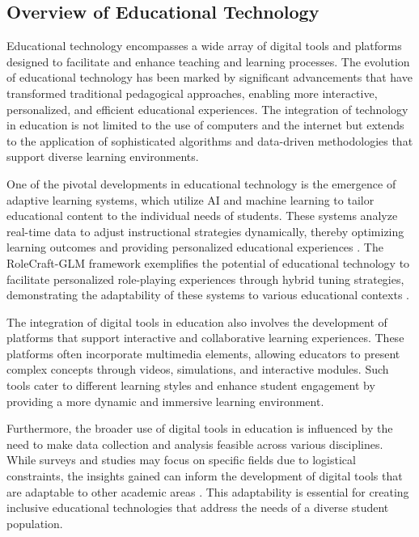 \subsection{Overview of Educational Technology} \label{subsec:Overview of Educational Technology}

Educational technology encompasses a wide array of digital tools and platforms designed to facilitate and enhance teaching and learning processes. The evolution of educational technology has been marked by significant advancements that have transformed traditional pedagogical approaches, enabling more interactive, personalized, and efficient educational experiences. The integration of technology in education is not limited to the use of computers and the internet but extends to the application of sophisticated algorithms and data-driven methodologies that support diverse learning environments.

One of the pivotal developments in educational technology is the emergence of adaptive learning systems, which utilize AI and machine learning to tailor educational content to the individual needs of students. These systems analyze real-time data to adjust instructional strategies dynamically, thereby optimizing learning outcomes and providing personalized educational experiences \cite{meek2015structureparameterlearningcausal}. The RoleCraft-GLM framework exemplifies the potential of educational technology to facilitate personalized role-playing experiences through hybrid tuning strategies, demonstrating the adaptability of these systems to various educational contexts \cite{tao2024rolecraftglmadvancingpersonalizedroleplaying}.

The integration of digital tools in education also involves the development of platforms that support interactive and collaborative learning experiences. These platforms often incorporate multimedia elements, allowing educators to present complex concepts through videos, simulations, and interactive modules. Such tools cater to different learning styles and enhance student engagement by providing a more dynamic and immersive learning environment.

Furthermore, the broader use of digital tools in education is influenced by the need to make data collection and analysis feasible across various disciplines. While surveys and studies may focus on specific fields due to logistical constraints, the insights gained can inform the development of digital tools that are adaptable to other academic areas \cite{cohen2015costreadingresearchstudy}. This adaptability is essential for creating inclusive educational technologies that address the needs of a diverse student population.

